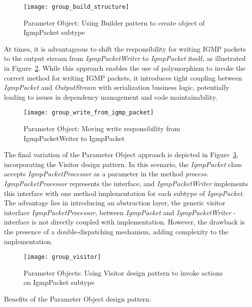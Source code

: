 \begin{figure}[!htb]
    \centering
    \texttt{[image: group\_build\_structure]}
    \caption{Parameter Object: Using Builder pattern to create object of IgmpPacket subtype}
    \label{fig:group_build_structure}
\end{figure}

At times, it is advantageous to shift the responsibility for writing IGMP packets to the output stream
from \textit{IgmpPacketWriter} to \textit{IgmpPacket} itself, as illustrated
in Figure~\ref{fig:group_write_from_igmp_packet}.
While this approach enables the use of polymorphism to invoke the correct method for writing IGMP packets,
it introduces tight coupling between \textit{IgmpPacket} and \textit{OutputStream} with serialization business logic,
potentially leading to issues in dependency management and code maintainability.

\begin{figure}[!htb]
    \centering
    \texttt{[image: group\_write\_from\_igmp\_packet]}
    \caption{Parameter Object: Moving write responsibility from IgmpPacketWriter to IgmpPacket}
    \label{fig:group_write_from_igmp_packet}
\end{figure}

The final variation of the Parameter Object approach is depicted in Figure~\ref{fig:group_visitor},
incorporating the Visitor design pattern.
In this scenario, the \textit{IgmpPacket} class accepts \textit{IgmpPacketProcessor} as a parameter
in the method \textit{process}.
\textit{IgmpPacketProcessor} represents the interface, and \textit{IgmpPacketWriter} implements this interface
with one method implementation for each subtype of \textit{IgmpPacket}.
The advantage lies in introducing an abstraction layer, the generic visitor interface \textit{IgmpPacketProcessor},
between \textit{IgmpPacket} and \textit{IgmpPacketWriter} - interface is not directly coupled with implementation.
However, the drawback is the presence of a double-dispatching mechanism, adding complexity to the implementation.

\begin{figure}[!htb]
    \centering
    \texttt{[image: group\_visitor]}
    \caption{Parameter Objects: Using Visitor design pattern to invoke actions on IgmpPacket subtype}
    \label{fig:group_visitor}
\end{figure}

Benefits of the Parameter Object design pattern:

